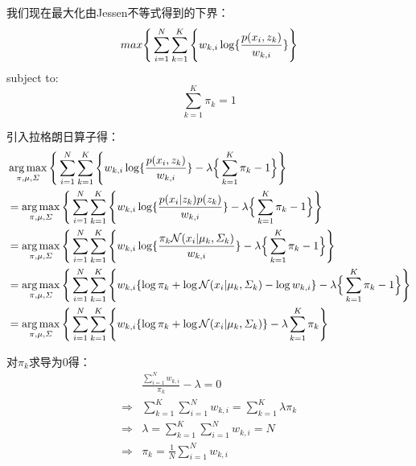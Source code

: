 我们现在最大化由Jessen不等式得到的下界：
\begin{displaymath}
\begin{split}
max \Bigg{\{} 
\sum_{i=1}^{N} \sum_{k=1}^{K} \Bigg{\{}
w_{k,i} \log \{ \frac{p(x_i,z_k)} {w_{k,i}}  \}
\Bigg{\}}
\end{split}
\end{displaymath}
subject to:
\begin{displaymath}
\sum_{k=1}^{K}{\pi_k} = 1
\end{displaymath}

引入拉格朗日算子得：
\begin{displaymath}
\begin{split}
&\mathop{\arg\max}_{\pi,\mu, \varSigma} \Bigg{\{} 
\sum_{i=1}^{N} \sum_{k=1}^{K} \Bigg{\{}
w_{k,i} \log \{ \frac{p(x_i,z_k)} {w_{k,i}}  \}
-\lambda \Big{\{} \sum_{k=1}^{K}{\pi_k}-1 \Big{\}}
\Bigg{\}}\\
&=\mathop{\arg\max}_{\pi,\mu, \varSigma} \Bigg{\{} 
\sum_{i=1}^{N} \sum_{k=1}^{K} \Bigg{\{}
w_{k,i} \log \{ \frac{p(x_i|z_k)p(z_k)} {w_{k,i}}  \}
-\lambda \Big{\{} \sum_{k=1}^{K}{\pi_k}-1 \Big{\}}
\Bigg{\}}\\
&=\mathop{\arg\max}_{\pi,\mu, \varSigma} \Bigg{\{} 
\sum_{i=1}^{N} \sum_{k=1}^{K} 
\Bigg{\{}
w_{k,i} \log \{ \frac{\pi_k \mathcal{N}(x_{i}|\mu_k,\varSigma_k)} {w_{k,i}}  \}
-\lambda \Big{\{} \sum_{k=1}^{K}{\pi_k}-1 \Big{\}}
\Bigg{\}}\\
&=\mathop{\arg\max}_{\pi,\mu, \varSigma} \Bigg{\{} 
\sum_{i=1}^{N} \sum_{k=1}^{K} 
\Bigg{\{}
w_{k,i} \{ 
\log{\pi_k} + \log{\mathcal{N}(x_{i}|\mu_k,\varSigma_k)}-\log{w_{k,i}}  
\}
-\lambda \Big{\{} \sum_{k=1}^{K}{\pi_k}-1 
\Big{\}}
\Bigg{\}}\\
&=\mathop{\arg\max}_{\pi,\mu, \varSigma} \Bigg{\{} 
\sum_{i=1}^{N} \sum_{k=1}^{K} 
\Bigg{\{}
w_{k,i} \{ 
\log{\pi_k} + \log{\mathcal{N}(x_{i}|\mu_k,\varSigma_k)} 
\}
-\lambda \sum_{k=1}^{K}{\pi_k} 
\Bigg{\}}\\
\end{split}
\end{displaymath}

对$\pi_k$求导为0得：
\begin{displaymath}
\begin{split}
&\frac{\sum_{i=1}^{N}{w_{k,i}}}{\pi_k}-\lambda = 0\\
\Longrightarrow & \sum_{k=1}^{K} \sum_{i=1}^{N} {w_{k,i}} =
\sum_{k=1}^{K}{\lambda \pi_k}\\
\Longrightarrow & \lambda = \sum_{k=1}^{K} \sum_{i=1}^{N} {w_{k,i}} =
N\\
\Longrightarrow & \pi_k = \frac{1}{N}\sum_{i=1}^{N}{w_{k,i}}
\end{split}
\end{displaymath}


